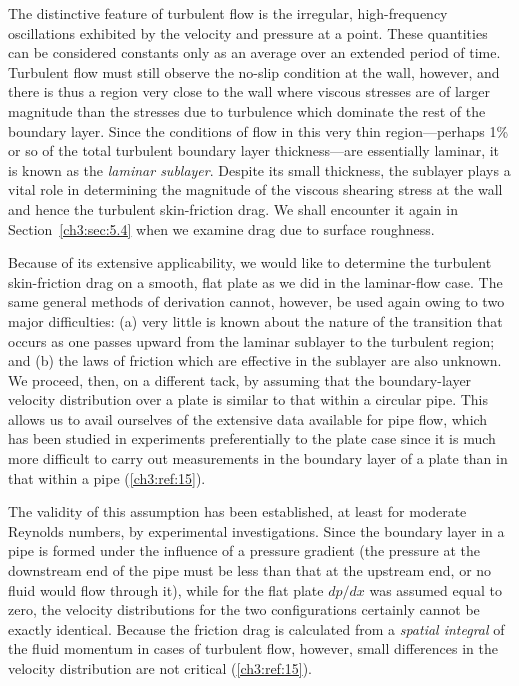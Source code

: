 The distinctive feature of turbulent flow is the irregular,
high-frequency oscillations exhibited by the velocity and pressure
at a point. These quantities can be considered constants only
as an average over an extended period of time. Turbulent flow
must still observe the no-slip condition at the wall, however,
and there is thus a region very close to the wall where viscous
stresses are of larger magnitude than the stresses due to
turbulence which dominate the rest of the boundary layer. Since
the conditions of flow in this very thin region---perhaps 1\%
or so of the total turbulent boundary layer thickness---are
essentially laminar, it is known as the \emph{laminar sublayer}.
Despite its small thickness, the sublayer plays a vital role
in determining the magnitude of the viscous shearing stress
at the wall and hence the turbulent skin-friction drag. We
shall encounter it again in Section~\ref{ch3:sec:5.4} when we examine drag
due to surface roughness.

Because of its extensive applicability, we would like to
determine the turbulent skin-friction drag on a smooth, flat
plate as we did in the laminar-flow case. The same general
methods of derivation cannot, however, be used again owing
to two major difficulties: (a) very little is known about
the nature of the transition that occurs as one passes upward
from the laminar sublayer to the turbulent region; and (b)
the laws of friction which are effective in the sublayer are
also unknown. We proceed, then, on a different tack, by
assuming that the boundary-layer velocity distribution over
a plate is similar to that within a circular pipe. This allows
us to avail ourselves of the extensive data available for pipe
flow, which has been studied in experiments preferentially to
the plate case since it is much more difficult to carry out
measurements in the boundary layer of a plate than in that
within a pipe (\ref{ch3:ref:15}).

The validity of this assumption has been established, at
least for moderate Reynolds numbers, by experimental investigations.
Since the boundary layer in a pipe is formed under
the influence of a pressure gradient (the pressure at the
downstream end of the pipe must be less than that at the upstream
end, or no fluid would flow through it), while for the flat
plate $dp/dx$ was assumed equal to zero, the velocity distributions
for the two configurations certainly cannot be exactly identical.
Because the friction drag is calculated from a \emph{spatial integral}
of the fluid momentum in cases of turbulent flow, however,
small differences in the velocity distribution are not critical
(\ref{ch3:ref:15}).

